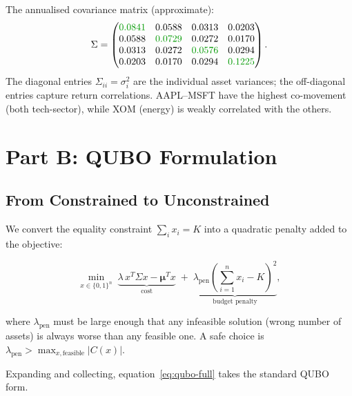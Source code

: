 \documentclass[a4paper,11pt]{article}
\newcommand{\cgr}[1]{\textcolor{codegreen}{#1}}
\begin{document}
\noindent The annualised covariance matrix (approximate):
\begin{equation}
    \Sigma = \begin{pmatrix}
        \cgr{0.0841} & 0.0588 & 0.0313 & 0.0203 \\
        0.0588 & \cgr{0.0729} & 0.0272 & 0.0170 \\
        0.0313 & 0.0272 & \cgr{0.0576} & 0.0294 \\
        0.0203 & 0.0170 & 0.0294 & \cgr{0.1225}
    \end{pmatrix}.
    \label{eq:sigma}
\end{equation}
The diagonal entries $\Sigma_{ii} = \sigma_i^2$ are the individual asset
variances; the off-diagonal entries capture return correlations.
AAPL--MSFT have the highest co-movement (both tech-sector), while
XOM (energy) is weakly correlated with the others.

\section{Part B: QUBO Formulation}

\subsection{From Constrained to Unconstrained}

We convert the equality constraint $\sum_i x_i = K$ into a quadratic
penalty added to the objective:

\begin{equation}
    \min_{x\in\{0,1\}^n}\;
    \underbrace{\lambda\, x^T\Sigma x - \boldsymbol\mu^T x}_{\text{cost}}
    \;+\;
    \underbrace{\lambda_\text{pen}\!\left(\sum_{i=1}^n x_i - K\right)^{\!2}}_{\text{budget penalty}},
    \label{eq:qubo-full}
\end{equation}

where $\lambda_\text{pen}$ must be large enough that any infeasible
solution (wrong number of assets) is always worse than any feasible one.
A safe choice is $\lambda_\text{pen} > \max_{x,\text{feasible}} |C(x)|$.

Expanding and collecting, equation~\eqref{eq:qubo-full} takes the
standard QUBO form.
\end{document}
